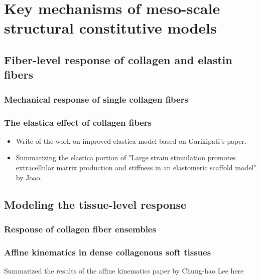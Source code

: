 \section{Key mechanisms of meso-scale structural constitutive models}
\subsection{Fiber-level response of collagen and elastin fibers}
\subsubsection{Mechanical response of single collagen fibers}
\subsubsection{The elastica effect of collagen fibers}
\begin{itemize}
\item Write of the work on improved elastica model based on Garikipati's paper.
\item Summarizing the elastica portion of "Large strain stimulation promotes extracellular matrix production and stiffness in an elastomeric scaffold model" by Joao. 
\end{itemize}

\subsection{Modeling the tissue-level response}
\subsubsection{Response of collagen fiber ensembles}
\subsubsection{Affine kinematics in dense collagenous soft tissues}
Summarized the results of the affine kinematics paper by Chung-hao Lee here











